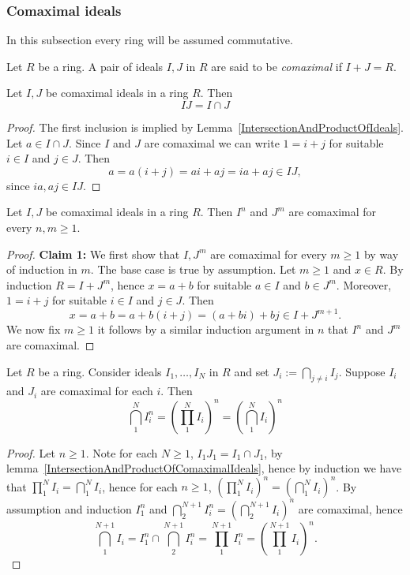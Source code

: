 \subsubsection{Comaximal ideals}
In this subsection every ring will be assumed commutative. 
\begin{definition}
    Let $R$ be a ring. A pair of ideals $I,J$ in $R$ are said to be \textit{comaximal} if $I+J = R$.
\end{definition}
\begin{lemma}\label{IntersectionAndProductOfComaximalIdeals}
    Let $I,J$ be comaximal ideals in a ring $R$. Then 
    $$IJ = I \cap J$$
\end{lemma}
\begin{proof}
    The first inclusion is implied by Lemma~\ref{IntersectionAndProductOfIdeals}. Let $a\in I\cap J$. Since $I$ and $J$ are comaximal we can write $1 = i+j$ for suitable $i\in I$ and $j\in J$. Then
    $$a=a(i+j) = ai+aj=ia+aj\in IJ,$$
    since $ia,aj\in IJ$.
\end{proof}
\begin{lemma}
    Let $I,J$ be comaximal ideals in a ring $R$. Then $I^n$ and $J^m$ are comaximal for every $n,m\geq 1$.
\end{lemma}
\begin{proof}
    \textbf{Claim 1:} We first show that $I,J^m$ are comaximal for every $m\geq 1$ by way of induction in $m$. The base case is true by assumption. Let $m\geq 1$ and $x\in R$. By induction $R= I+J^m$, hence $x=a+b$ for suitable $a\in I$ and $b\in J^m$. Moreover, $1=i+j$ for suitable $i\in I$ and $j\in J$. Then 
    $$x=a+b= a+b(i+j)=(a+bi)+bj\in I+J^{m+1}.$$
    We now fix $m\geq 1$ it follows by a similar induction argument in $n$ that $I^n$ and $J^m$ are comaximal. 
\end{proof}
\begin{lemma}\label{ForComaximalIdealsFiniteIntersectionCommutesWithExponentiation}
    Let $R$ be a ring. Consider ideals $I_1,\dots,I_N$ in $R$ and set $J_i := \bigcap_{j\neq i} I_j$. Suppose $I_i$ and $J_i$ are comaximal for each $i$. Then $$\bigcap_1^N I_i^n=\left(\prod_1^NI_i\right)^n= \left(\bigcap_1^N I_i\right)^n $$
\end{lemma}
\begin{proof}
    Let $n\geq 1$. Note for each $N\geq 1$, $I_1J_1=I_1\cap J_1$, by lemma~\ref{IntersectionAndProductOfComaximalIdeals}, hence by induction we have that $\prod_1^N I_i = \bigcap_1^N I_i$, hence for each $n\geq 1$, $\left(\prod_1^NI_i\right)^n= \left(\bigcap_1^N I_i\right)^n$. By assumption and induction $I_1^{n}$ and $\bigcap_2^{N+1} I_i^n = \left(\bigcap_2^{N+1} I_i\right)^n$ are comaximal, hence 
    $$\bigcap_1^{N+1} I_i = I_1^n\cap \bigcap_2^{N+1} I_i^n= \prod_1^{N+1} I_i^n=\left(\prod_1^{N+1} I_i\right)^n.$$
\end{proof}
